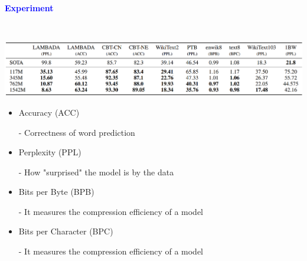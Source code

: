 \documentclass[professionalfont]{beamer}
\begin{document}
\begin{frame}
\begin{center}
    { \textbf{\textcolor{blue}{ {\fontsize{12}{14}\selectfont Experiment} }} }
\end{center}
\\[0.3cm]
\begin{center}
    \includegraphics[width=1.0\textwidth]{table3.png}
\end{center}

{\fontsize{10}{14}\selectfont 
\begin{itemize}
    \item Accuracy (ACC)
    
    - Correctness of word prediction

    \item Perplexity (PPL)
    
    - How "surprised" the model is by the data

    \item Bits per Byte (BPB)
    
    - It measures the compression efficiency of a model

    \item Bits per Character (BPC)
    
    - It measures the compression efficiency of a model

\end{itemize}
}

\end{frame}
\end{document}
